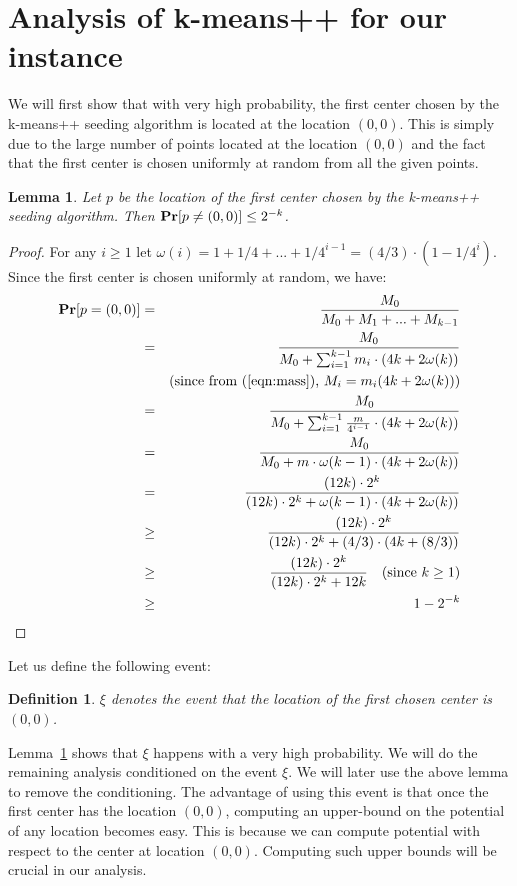 \documentclass[11pt]{article}
\newtheorem{lemma}[theorem]{Lemma}
\newtheorem{definition}[theorem]{Definition}
\newcommand{\pr}{{\bf Pr}}
\begin{document}
\section{Analysis of k-means++ for our instance}

We will first show that with very high probability, the first center chosen by the k-means++ seeding algorithm is located at the location $(0, 0)$.
This is simply due to the large number of points located at the location $(0, 0)$ and the fact that the first center is chosen uniformly at random from all the given points.

\begin{lemma}\label{lemma:event} 
Let $p$ be the location of the first center chosen by the k-means++ seeding algorithm. Then $\pr[p \neq (0, 0)] \leq 2^{-k}$.
\end{lemma}

\begin{proof}
For any $i \geq 1$ let $\omega(i) = 1 + 1/4 + ... + 1/4^{i-1} = (4/3) \cdot (1 - 1/4^i)$. 
Since the first center is chosen uniformly at random, we have:
{
\allowdisplaybreaks
\begin{eqnarray*}
\pr[p = (0, 0)] &=& \frac{M_0}{M_0 + M_1 + ... + M_{k-1}} \\
&=& \frac{M_0}{M_0 + \sum_{i=1}^{k-1} m_i \cdot (4k + 2\omega(k))} \\
&& \textrm{(since from (\ref{eqn:mass}), $M_i = m_i (4k + 2 \omega(k))$)} \\
&=& \frac{M_0}{M_0 + \sum_{i=1}^{k-1} \frac{m}{4^{i-1}} \cdot (4k + 2\omega(k))} \\
&=& \frac{M_0}{M_0 + m \cdot \omega(k-1) \cdot (4k + 2\omega(k))} \\
&=& \frac{(12 k) \cdot 2^{k}}{(12 k) \cdot 2^k + \omega(k-1) \cdot (4k + 2 \omega(k))} \\
&\geq& \frac{(12 k) \cdot 2^{k}}{(12 k) \cdot 2^k + (4/3) \cdot (4k + (8/3))}\\
&\geq& \frac{(12 k) \cdot 2^{k}}{(12 k) \cdot 2^k + 12k} \quad \textrm{(since $k \geq 1$)}\\
&\geq& 1 - 2^{-k}
\end{eqnarray*}
}
\end{proof}

Let us define the following event:
\begin{definition}\label{defn:event}
$\xi$ denotes the event that the location of the first chosen center is $(0, 0)$.
\end{definition}

Lemma~\ref{lemma:event} shows that $\xi$ happens with a very high probability.
We will do the remaining analysis conditioned on the event $\xi$. 
We will later use the above lemma to remove the conditioning. 
The advantage of using this event is that once the first center has the location $(0, 0)$, computing an upper-bound on the potential of any location becomes easy.
This is because we can compute potential with respect to the center at location $(0, 0)$. 
Computing such upper bounds will be crucial in our analysis.
\end{document}
